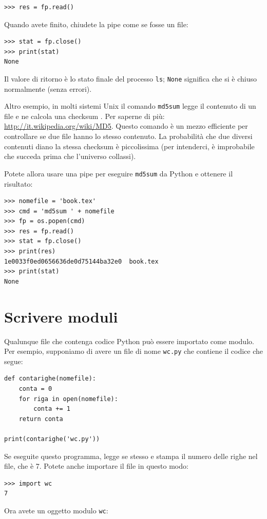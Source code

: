 \documentclass[10pt]{book}
\begin{document}
\begin{verbatim}
>>> res = fp.read()
\end{verbatim}
%
Quando avete finito, chiudete la pipe come se fosse un file:

\begin{verbatim}
>>> stat = fp.close()
>>> print(stat)
None
\end{verbatim}
%
Il valore di ritorno è lo stato finale del processo {\tt ls};
{\tt None} significa che si è chiuso normalmente (senza errori).

Altro esempio, in molti sistemi Unix il comando {\tt md5sum}
legge il contenuto di un file e ne calcola una checksum . Per saperne di più: \url{http://it.wikipedia.org/wiki/MD5}.  Questo comando è un mezzo efficiente per controllare se due file hanno lo stesso contenuto. La probabilità che due diversi contenuti diano la stessa checksum è piccolissima (per intenderci, è improbabile che succeda prima che l'universo collassi).

Potete allora usare una pipe per eseguire {\tt md5sum} da Python e ottenere il risultato:

\begin{verbatim}
>>> nomefile = 'book.tex'
>>> cmd = 'md5sum ' + nomefile
>>> fp = os.popen(cmd)
>>> res = fp.read()
>>> stat = fp.close()
>>> print(res)
1e0033f0ed0656636de0d75144ba32e0  book.tex
>>> print(stat)
None
\end{verbatim}


\section{Scrivere moduli}
\label{modules}

Qualunque file che contenga codice Python può essere importato come modulo. Per esempio, supponiamo di avere un file di nome {\tt wc.py} che contiene il codice che segue:

\begin{verbatim}
def contarighe(nomefile):
    conta = 0
    for riga in open(nomefile):
        conta += 1
    return conta

print(contarighe('wc.py'))
\end{verbatim}
%
Se eseguite questo programma, legge se stesso e stampa il numero delle righe nel file, che è 7. Potete anche importare il file in questo modo:

\begin{verbatim}
>>> import wc
7
\end{verbatim}
%
Ora avete un oggetto modulo {\tt wc}:
\end{document}
